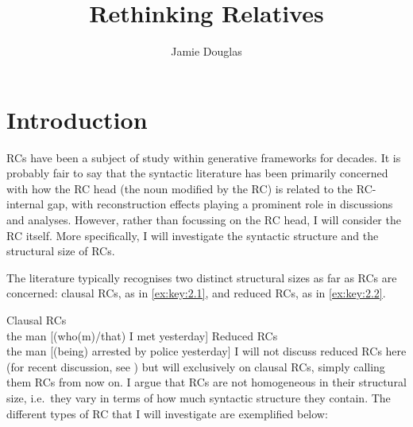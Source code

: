\documentclass[output=paper]{langsci/langscibook}
\author{Jamie Douglas\affiliation{University of Cambridge}}
\title{Rethinking Relatives}
\begin{document}
\glsresetall

\section{Introduction}\label{sec:key:02.1}

\Glspl{RC} have been a subject of study within generative frameworks for
decades. It is probably fair to say that the syntactic literature has been
primarily concerned with how the \gls{RC} head (the noun
modified by the RC) is related to the RC-internal gap, with reconstruction
effects playing a prominent role in discussions and analyses. However, rather
than focussing on the \gls{RC} head, I will consider the \gls{RC} itself.  More specifically, I will investigate the syntactic structure
and the structural size of  \glspl{RC}.

The literature typically recognises two distinct structural sizes as far as RCs
are concerned: clausal RCs, as in \eqref{ex:key:2.1}, and reduced RCs, as in \eqref{ex:key:2.2}.

\ea\label{ex:key:2.1} Clausal RCs\\
    the man [(who(m)/that) I met yesterday]
\z
\ea\label{ex:key:2.2} Reduced RCs\\
    the man [(being) arrested by police yesterday]
\z
I will not discuss reduced \glspl{RC} here (for recent discussion, see
\citealt{Douglas2016,Harwood2017}) but will  exclusively on clausal RCs,
simply calling them \glspl{RC} from now on. I argue that \glspl{RC} are not
homogeneous in their structural size, i.e.\ they vary in terms of how much
syntactic structure they contain. The different types of \gls{RC} that I will
investigate are exemplified below:
\end{document}
